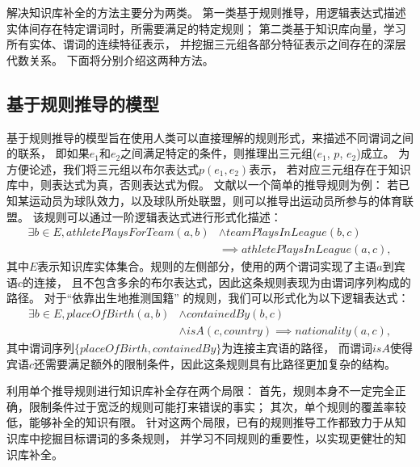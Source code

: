 解决知识库补全的方法主要分为两类。
第一类基于规则推导，用逻辑表达式描述实体间存在特定谓词时，所需要满足的特定规则；
第二类基于知识库向量，学习所有实体、谓词的连续特征表示，
并挖掘三元组各部分特征表示之间存在的深层代数关系。
下面将分别介绍这两种方法。

\subsection{基于规则推导的模型} %

基于规则推导的模型旨在使用人类可以直接理解的规则形式，来描述不同谓词之间的联系，
即如果$e_1$和$e_2$之间满足特定的条件，则推理出三元组($e_1$, $p$, $e_2$)成立。
为方便论述，我们将三元组以布尔表达式$p(e_1, e_2)$表示，
若对应三元组存在于知识库中，则表达式为真，否则表达式为假。
文献\parencite{lao2011random}以一个简单的推导规则为例：
若已知某运动员为球队效力，以及球队所处联盟，则可以推导出运动员所参与的体育联盟。
该规则可以通过一阶逻辑表达式进行形式化描述：
\begin{equation}
\begin{aligned}
\exists b \in E, athletePlaysForTeam(a, b) & \land teamPlaysInLeague(b, c) \\
                                           & \implies athletePlaysInLeague(a, c),
\end{aligned}
\end{equation}
\noindent
其中$E$表示知识库实体集合。规则的左侧部分，使用的两个谓词实现了主语$a$到宾语$c$的连接，
且不包含多余的布尔表达式，因此这条规则表现为由谓词序列构成的路径。
对于``{依靠出生地推测国籍}'' 的规则，我们可以形式化为以下逻辑表达式：
\begin{equation}
\begin{aligned}
  \exists b \in E, placeOfBirth(a, b) & \land containedBy(b, c) \\
                                      & \land isA(c, country) \implies nationality(a, c),
\end{aligned}
\end{equation}
\noindent
其中谓词序列$\{placeOfBirth, containedBy\}$为连接主宾语的路径，
而谓词$isA$使得宾语$c$还需要满足额外的限制条件，因此这条规则具有比路径更加复杂的结构。

利用单个推导规则进行知识库补全存在两个局限：
首先，规则本身不一定完全正确，限制条件过于宽泛的规则可能打来错误的事实；
其次，单个规则的覆盖率较低，能够补全的知识有限。
针对这两个局限，已有的规则推导工作都致力于从知识库中挖掘目标谓词的多条规则，
并学习不同规则的重要性，以实现更健壮的知识库补全。

